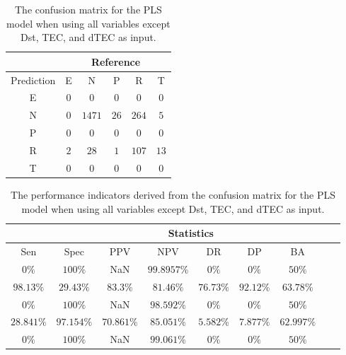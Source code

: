 \begin{table}[!ht]
	\centering
	\begin{tabular}{|c|c|c|c|c|c|}
		\hline
		 & \multicolumn{5}{|c|}{Reference} \\ \hline
		 Prediction & E & N & P & R & T \\ \hline
		 E & $0$ & $0$ & $0$ & $0$ & $0$ \\ \hline
		 N & $0$ & $1471$ & $26$ & $264$ & $5$ \\ \hline
		 P & $0$ & $0$ & $0$ & $0$ & $0$ \\ \hline
		 R & $2$ & $28$ & $1$ & $107$ & $13$ \\ \hline
		 T & $0$ & $0$ & $0$ & $0$ & $0$ \\ \hline
	\end{tabular}
	\caption{The confusion matrix for the PLS model when using all variables except Dst, TEC, and dTEC as input.}
	\label{tab:cm:noTEC:pls}
\end{table}

\begin{table}[!ht]
	\centering
	\begin{tabular}{|c|c|c|c|c|c|c|c|c|}
		\hline
		 & \multicolumn{7}{c|}{Statistics} \\ \hline
		Sen & Spec & PPV & NPV & DR & DP & BA \\ \hline
		$0\%$ & $100\%$ & NaN & $99.8957\%$ & $0\%$ & $0\%$ & $50\%$ \\ \hline
		$98.13\%$ & $29.43\%$ & $83.3\%$ & $81.46\%$ & $76.73\%$ & $92.12\%$ & $63.78\%$ \\ \hline
		$0\%$ & $100\%$ & NaN & $98.592\%$ & $0\%$ & $0\%$ & $50\%$ \\ \hline
		$28.841\%$ & $97.154\%$ & $70.861\%$ & $85.051\%$ & $5.582\%$ & $7.877\%$ & $62.997\%$ \\ \hline
		$0\%$ & $100\%$ & NaN & $99.061\%$ & $0\%$ & $0\%$ & $50\%$ \\ \hline
	\end{tabular}
	\caption{The performance indicators derived from the confusion matrix for the PLS model when using all variables except Dst, TEC, and dTEC as input.}
	\label{tab:cs:noTEC:pls}
\end{table}

